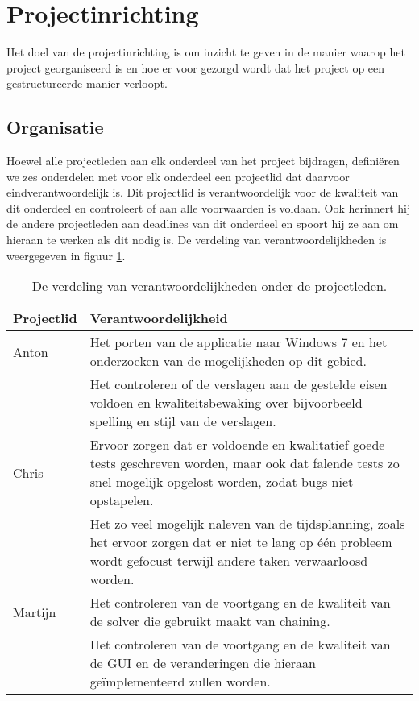 \section{Projectinrichting}
Het doel van de projectinrichting is om inzicht te geven in de manier waarop het project georganiseerd is en hoe er voor gezorgd wordt dat het project op een gestructureerde manier verloopt.

\subsection{Organisatie}
Hoewel alle projectleden aan elk onderdeel van het project bijdragen, definiëren we zes onderdelen met voor elk onderdeel een projectlid dat daarvoor eindverantwoordelijk is. Dit projectlid is verantwoordelijk voor de kwaliteit van dit onderdeel en controleert of aan alle voorwaarden is voldaan. Ook herinnert hij de andere projectleden aan deadlines van dit onderdeel en spoort hij ze aan om hieraan te werken als dit nodig is. De verdeling van verantwoordelijkheden is weergegeven in figuur \ref{fig:organisatie}.

\begin{table}[!h]
\label{fig:organisatie}
\def\arraystretch{1.5}
\begin{tabularx}{\textwidth}{|p{2cm}|X|}
\hline
\textbf{Projectlid} & \textbf{Verantwoordelijkheid} \\ \hline
Anton & Het porten van de applicatie naar Windows 7 en het onderzoeken van de mogelijkheden op dit gebied. \\ \cline{2-2}
& Het controleren of de verslagen aan de gestelde eisen voldoen en kwaliteitsbewaking over bijvoorbeeld spelling en stijl van de verslagen. \\ \hline
Chris & Ervoor zorgen dat er voldoende en kwalitatief goede tests geschreven worden, maar ook dat falende tests zo snel mogelijk opgelost worden, zodat bugs niet opstapelen. \\ \cline{2-2}
& Het zo veel mogelijk naleven van de tijdsplanning, zoals het ervoor zorgen dat er niet te lang op één probleem wordt gefocust terwijl andere taken verwaarloosd worden. \\ \hline
Martijn & Het controleren van de voortgang en de kwaliteit van de solver die gebruikt maakt van chaining. \\ \cline{2-2}
& Het controleren van de voortgang en de kwaliteit van de GUI en de veranderingen die hieraan ge\"implementeerd zullen worden. \\ \hline
\end{tabularx}
\caption{De verdeling van verantwoordelijkheden onder de projectleden.}
\end{table}

